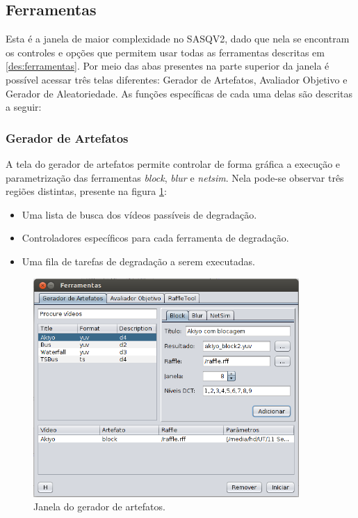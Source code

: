 \subsection{Ferramentas}

Esta é a janela de maior complexidade no SASQV2, dado que nela se encontram os controles e opções que permitem usar todas as ferramentas descritas em \ref{des:ferramentas}. 
Por meio das abas presentes na parte superior da janela é possível acessar três telas diferentes: Gerador de Artefatos, Avaliador Objetivo e Gerador de Aleatoriedade. As funções específicas de cada uma delas são descritas a seguir:

\subsubsection{Gerador de Artefatos}

A tela do gerador de artefatos permite controlar de forma gráfica a execução e parametrização das ferramentas \emph{block}, \emph{blur} e \emph{netsim}. Nela pode-se observar três regiões distintas, presente na figura \ref{fig:geradorartefatos}:

\begin{itemize}
	\item Uma lista de busca dos vídeos passíveis de degradação.
	\item Controladores específicos para cada ferramenta de degradação.
	\item Uma fila de tarefas de degradação a serem executadas.
\end{itemize}

\begin{figure}[!htb]
	\centering
	\includegraphics[width=0.9\textwidth]{./imgs/degradacao.png}
	\caption{Janela do gerador de artefatos.}
	\label{fig:geradorartefatos}
\end{figure}

